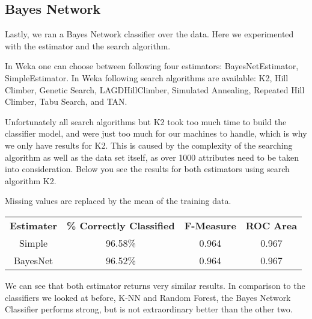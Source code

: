 \documentclass{article}
\begin{document}
\subsection{Bayes Network}
Lastly, we ran a Bayes Network classifier over the data. Here we experimented with the estimator and the search algorithm.

In Weka one can choose between following four estimators: BayesNetEstimator, SimpleEstimator.
In Weka following search algorithms are available: K2, Hill Climber, Genetic Search, LAGDHillClimber, Simulated Annealing, Repeated Hill Climber, Tabu Search, and TAN.

Unfortunately all search algorithms but K2 took too much time to build the classifier model, and were just too much for our machines to handle, which is why we only have results for K2. This is caused by the complexity of the searching algorithm as well as the data set itself, as over 1000 attributes need to be taken into consideration. Below you see the results for both estimators using search algorithm K2.

Missing values are replaced by the mean of the training data. 

\begin{center}
\begin{tabular}{ c | c | c | c}
\textbf{Estimater} & \textbf{\% Correctly Classified} & \textbf{F-Measure} & \textbf{ROC Area}\\
Simple   & 96.58\% & 0.964 & 0.967\\
BayesNet & 96.52\% & 0.964 & 0.967\\
\end{tabular}
\end{center}

We can see that both estimator returns very similar results. In comparison to the classifiers we looked at before, K-NN and Random Forest, the Bayes Network Classifier performs strong, but is not extraordinary better than the other two. 
\end{document}
